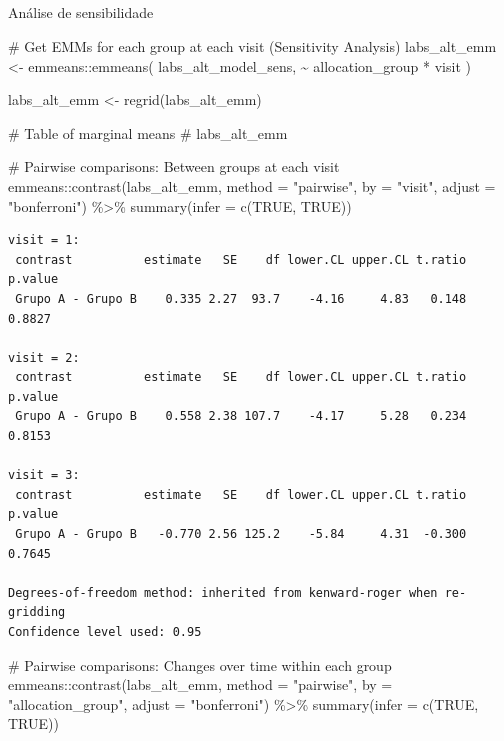 \documentclass[
  12pt,
]{article}
\makeatletter
\let\oldsubparagraph\subparagraph
\renewcommand{\subparagraph}{
    \@ifstar
      \xxxSubParagraphStar
      \xxxSubParagraphNoStar
  }
\newcommand{\xxxSubParagraphStar}[1]{\oldsubparagraph*{#1}\mbox{}}
\newcommand{\xxxSubParagraphNoStar}[1]{\oldsubparagraph{#1}\mbox{}}
\newenvironment{Shaded}{\begin{snugshade}}{\end{snugshade}}
\newcommand{\AttributeTok}[1]{\textcolor[rgb]{0.40,0.45,0.13}{#1}}
\newcommand{\CommentTok}[1]{\textcolor[rgb]{0.37,0.37,0.37}{#1}}
\newcommand{\ConstantTok}[1]{\textcolor[rgb]{0.56,0.35,0.01}{#1}}
\newcommand{\FunctionTok}[1]{\textcolor[rgb]{0.28,0.35,0.67}{#1}}
\newcommand{\NormalTok}[1]{\textcolor[rgb]{0.00,0.23,0.31}{#1}}
\newcommand{\OtherTok}[1]{\textcolor[rgb]{0.00,0.23,0.31}{#1}}
\newcommand{\SpecialCharTok}[1]{\textcolor[rgb]{0.37,0.37,0.37}{#1}}
\newcommand{\StringTok}[1]{\textcolor[rgb]{0.13,0.47,0.30}{#1}}
\makeatother
\begin{document}
\subparagraph{Análise de
sensibilidade}\label{anuxe1lise-de-sensibilidade-1}

\begin{Shaded}
\begin{Highlighting}[]
\CommentTok{\# Get EMMs for each group at each visit (Sensitivity Analysis)}
\NormalTok{labs\_alt\_emm }\OtherTok{\textless{}{-}}\NormalTok{ emmeans}\SpecialCharTok{::}\FunctionTok{emmeans}\NormalTok{(}
\NormalTok{    labs\_alt\_model\_sens, }
    \SpecialCharTok{\textasciitilde{}}\NormalTok{ allocation\_group }\SpecialCharTok{*}\NormalTok{ visit}
\NormalTok{)}

\NormalTok{labs\_alt\_emm }\OtherTok{\textless{}{-}} \FunctionTok{regrid}\NormalTok{(labs\_alt\_emm)}

\CommentTok{\# Table of marginal means}
\CommentTok{\# labs\_alt\_emm}

\CommentTok{\# Pairwise comparisons: Between groups at each visit}
\NormalTok{emmeans}\SpecialCharTok{::}\FunctionTok{contrast}\NormalTok{(labs\_alt\_emm,}
\AttributeTok{method =} \StringTok{"pairwise"}\NormalTok{, }\AttributeTok{by =} \StringTok{"visit"}\NormalTok{,}
\AttributeTok{adjust =} \StringTok{"bonferroni"}\NormalTok{) }\SpecialCharTok{\%\textgreater{}\%} \FunctionTok{summary}\NormalTok{(}\AttributeTok{infer =} \FunctionTok{c}\NormalTok{(}\ConstantTok{TRUE}\NormalTok{, }\ConstantTok{TRUE}\NormalTok{))}
\end{Highlighting}
\end{Shaded}

\begin{verbatim}
visit = 1:
 contrast          estimate   SE    df lower.CL upper.CL t.ratio p.value
 Grupo A - Grupo B    0.335 2.27  93.7    -4.16     4.83   0.148  0.8827

visit = 2:
 contrast          estimate   SE    df lower.CL upper.CL t.ratio p.value
 Grupo A - Grupo B    0.558 2.38 107.7    -4.17     5.28   0.234  0.8153

visit = 3:
 contrast          estimate   SE    df lower.CL upper.CL t.ratio p.value
 Grupo A - Grupo B   -0.770 2.56 125.2    -5.84     4.31  -0.300  0.7645

Degrees-of-freedom method: inherited from kenward-roger when re-gridding 
Confidence level used: 0.95 
\end{verbatim}

\begin{Shaded}
\begin{Highlighting}[]
\CommentTok{\# Pairwise comparisons: Changes over time within each group}
\NormalTok{emmeans}\SpecialCharTok{::}\FunctionTok{contrast}\NormalTok{(labs\_alt\_emm,}
\AttributeTok{method =} \StringTok{"pairwise"}\NormalTok{, }\AttributeTok{by =} \StringTok{"allocation\_group"}\NormalTok{,}
\AttributeTok{adjust =} \StringTok{"bonferroni"}\NormalTok{) }\SpecialCharTok{\%\textgreater{}\%} \FunctionTok{summary}\NormalTok{(}\AttributeTok{infer =} \FunctionTok{c}\NormalTok{(}\ConstantTok{TRUE}\NormalTok{, }\ConstantTok{TRUE}\NormalTok{))}
\end{Highlighting}
\end{Shaded}
\end{document}
